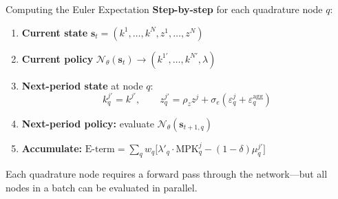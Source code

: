 \documentclass[aspectratio=169,11pt]{beamer}
\newcommand{\emphc}[1]{\textcolor{harvardcrimson}{#1}}
\begin{document}
\begin{frame}{Computing the Euler Expectation}
\textbf{Step-by-step} for each quadrature node $q$:

\vspace{0.3em}
\begin{enumerate}
    \item \textbf{Current state} $\bm{s}_t = (k^1, \ldots, k^N, z^1, \ldots, z^N)$
    \item \textbf{Current policy} $\mathcal{N}_\theta(\bm{s}_t) \to (k^{1\prime}, \ldots, k^{N\prime}, \lambda)$ 
    \item \textbf{Next-period state} at node $q$:
    \[
    k^{j\prime}_q = k^{j\prime}, \qquad z^{j\prime}_q = \rho_z z^j + \sigma_e(\varepsilon^j_q + \varepsilon^{\text{agg}}_q)
    \]
    \item \textbf{Next-period policy:} evaluate $\mathcal{N}_\theta(\bm{s}_{t+1,q})$
    \item \textbf{Accumulate:} $\text{E-term} = \sum_q w_q \bigl[\lambda'_q \cdot \text{MPK}^j_q - (1-\delta)\mu^{j\prime}_q\bigr]$
\end{enumerate}

\vspace{0.3em}
{\small Each quadrature node requires a \emphc{forward pass} through the network---but all nodes in a batch can be evaluated in parallel.}
\end{frame}
\end{document}
